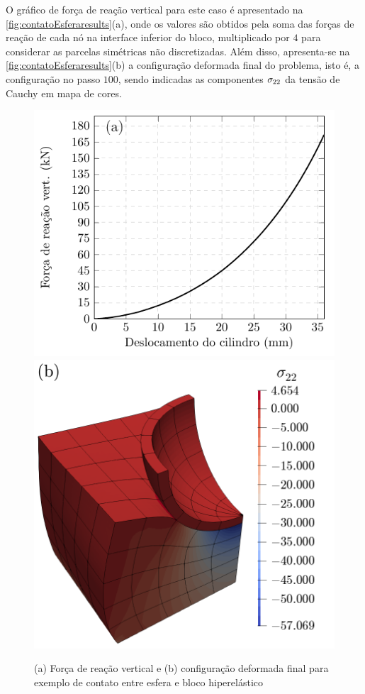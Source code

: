 \documentclass[Tese.tex]{subfiles}
\begin{document}
O gráfico de força de reação vertical para este caso é apresentado na \autoref{fig:contatoEsferaresults}(a), onde os valores são obtidos pela soma das forças de reação de cada nó na interface inferior do bloco, multiplicado por $4$ para considerar as parcelas simétricas não discretizadas. Além disso, apresenta-se na \autoref{fig:contatoEsferaresults}(b) a configuração deformada final do problema, isto é, a configuração no passo $100$, sendo indicadas as componentes ${\sigma}_{22}$ da tensão de Cauchy em mapa de cores.

\begin{figure}[!htb]
	\centering
	\caption{(a) Força de reação vertical e (b) configuração deformada final para exemplo de contato entre esfera e bloco hiperelástico}
	\label{fig:contatoEsferaresults}
	\includegraphics[scale=1.0]{Figuras/ExemplosContato/contatoEsferaReaction.pdf}\;\;\;\includegraphics[scale=0.235]{Figuras/ExemplosContato/contatoEsferaResultsB.png}
\end{figure}
\end{document}
